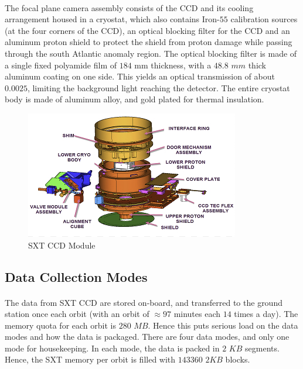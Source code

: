 \documentclass[a4paper,twoside]{report}
\numberwithin{equation}{section}
\begin{document}
\paragraph{}
The focal plane camera assembly consists of the CCD and its cooling arrangement housed in a cryostat, which also contains Iron-$55$ calibration sources (at the four corners of the CCD), an optical blocking filter for the CCD and an aluminum proton shield to protect the shield from proton damage while passing through the south Atlantic anomaly region. The optical blocking filter is made of a single fixed polyamide film of $184$ mm thickness, with a $48.8$ $mm$ thick aluminum coating on one side. This yields an optical transmission of about $0.0025$, limiting the background light reaching the detector. The entire cryostat body is made of aluminum alloy, and gold plated for thermal insulation.
\begin{figure}
\includegraphics[width=1.0\linewidth]{IMp2.jpg} 
\caption{SXT CCD Module}
\label{fig:CCD Module}
\end{figure}
\subsection{Data Collection Modes}
\paragraph{}
The data from SXT CCD are stored on-board, and transferred to the ground station once each orbit (with an orbit of $\approx 97$ minutes each $14$ times a day). The memory quota for each orbit is $280$ $MB$. Hence this puts serious load on the data modes and how the data is packaged. There are four data modes, and only one mode for housekeeping. In each mode, the data is packed in $2$ $KB$ segments. Hence, the SXT memory per orbit is filled with $143360$ $2KB$ blocks. 
\end{document}
